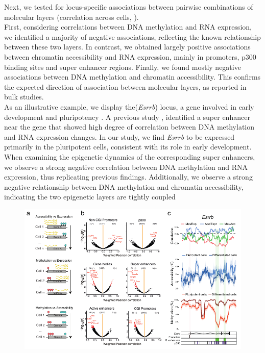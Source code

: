 Next, we tested for locus-specific associations between pairwise combinations of molecular layers (correlation across cells, ).\\
First, considering correlations between DNA methylation and RNA expression, we identified a majority of negative associations, reflecting the known relationship between these two layers. In contrast, we obtained largely positive associations between chromatin accessibility and RNA expression, mainly in promoters, p300 binding sites and super enhancer regions. Finally, we found mostly negative associations between DNA methylation and chromatin accessibility. This confirms the expected direction of association between molecular layers, as reported in bulk studies.\\
As an illustrative example, we display the(\textit{Esrrb}) locus, a gene involved in early development and pluripotency \cite{Papp2012}. A previous study \cite{Angermueller2016}, identified a super enhancer near the gene that showed high degree of correlation between DNA methylation and RNA expression changes. In our study, we find \textit{Esrrb} to be expressed primarily in the pluripotent cells, consistent with its role in early development. When examining the epigenetic dynamics of the corresponding super enhancers, we observe a strong negative correlation between DNA methylation and RNA expression, thus replicating previous findings. Additionally, we observe a strong negative relationship between DNA methylation and chromatin accessibility, indicating the two epigenetic layers are tightly coupled

\begin{figure}[H]
	\centering
	\includegraphics[width=0.9\linewidth]{scNMT_EB_correlations}
	\caption[]{}
	\label{fig:scnmt_eb_correlations}
\end{figure}

